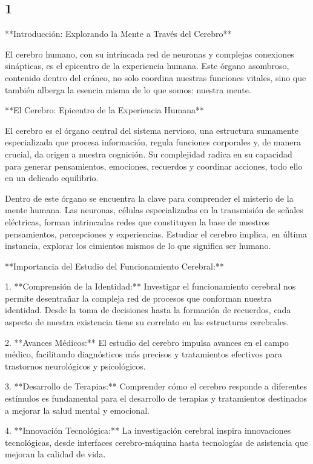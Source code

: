 \documentclass[12pt,oneside]{uhthesis}
\begin{document}
\subsection{1}
**Introducción: Explorando la Mente a Través del Cerebro**

El cerebro humano, con su intrincada red de neuronas y complejas conexiones sinápticas, es el epicentro de la experiencia humana. Este órgano asombroso, contenido dentro del cráneo, no solo coordina nuestras funciones vitales, sino que también alberga la esencia misma de lo que somos: nuestra mente.

**El Cerebro: Epicentro de la Experiencia Humana**

El cerebro es el órgano central del sistema nervioso, una estructura sumamente especializada que procesa información, regula funciones corporales y, de manera crucial, da origen a nuestra cognición. Su complejidad radica en su capacidad para generar pensamientos, emociones, recuerdos y coordinar acciones, todo ello en un delicado equilibrio.

Dentro de este órgano se encuentra la clave para comprender el misterio de la mente humana. Las neuronas, células especializadas en la transmisión de señales eléctricas, forman intrincadas redes que constituyen la base de nuestros pensamientos, percepciones y experiencias. Estudiar el cerebro implica, en última instancia, explorar los cimientos mismos de lo que significa ser humano.

**Importancia del Estudio del Funcionamiento Cerebral:**

1. **Comprensión de la Identidad:** Investigar el funcionamiento cerebral nos permite desentrañar la compleja red de procesos que conforman nuestra identidad. Desde la toma de decisiones hasta la formación de recuerdos, cada aspecto de nuestra existencia tiene su correlato en las estructuras cerebrales.

2. **Avances Médicos:** El estudio del cerebro impulsa avances en el campo médico, facilitando diagnósticos más precisos y tratamientos efectivos para trastornos neurológicos y psicológicos.

3. **Desarrollo de Terapias:** Comprender cómo el cerebro responde a diferentes estímulos es fundamental para el desarrollo de terapias y tratamientos destinados a mejorar la salud mental y emocional.

4. **Innovación Tecnológica:** La investigación cerebral inspira innovaciones tecnológicas, desde interfaces cerebro-máquina hasta tecnologías de asistencia que mejoran la calidad de vida.
\end{document}
